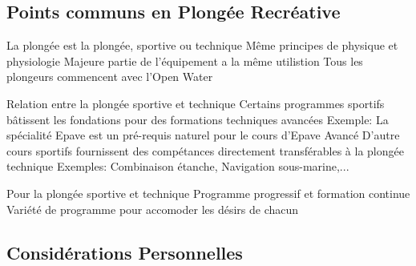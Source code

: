\subsection{Points communs en Plongée Recréative}

\begin{frame}{\insertsubsection}
	\begin{outline}
		\1 La plongée est la plongée, sportive ou technique
			\2 Même principes de physique et physiologie
			\2 Majeure partie de l'équipement a la même utilistion
			\2 Tous les plongeurs commencent avec l'Open Water
	\end{outline}
\end{frame}

\begin{frame}{\insertsubsection}
	\begin{outline}
		\1 Relation entre la plongée sportive et technique
			\2 Certains programmes sportifs bâtissent les fondations pour des formations techniques avancées
				\3 Exemple: La spécialité Epave est un pré-requis naturel pour le cours d'Epave Avancé
			\2 D'autre cours sportifs fournissent des compétances directement transférables à la plongée technique
				\3 Exemples: Combinaison étanche, Navigation sous-marine,...
	\end{outline}
\end{frame}

\begin{frame}{\insertsubsection}
	\begin{outline}
		\1 Pour la plongée sportive et technique
			\2 Programme progressif et formation continue
			\2 Variété de programme pour accomoder les désirs de chacun
	\end{outline}
\end{frame}


\subsection{Considérations Personnelles}

